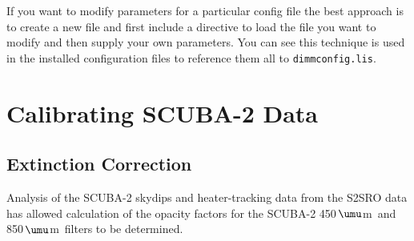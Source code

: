 \documentclass[twoside,11pt]{article}
\newcommand{\micron}{\mbox{\,${\umu}$m}}            %
\newcommand{\xlabel}[1]{}
\renewcommand{\_}{\texttt{\symbol{95}}}
\begin{document}
\begin{description}


\end{description}

If you want to modify parameters for a particular config file the best
approach is to create a new file and first include a directive to load
the file you want to modify and then supply your own parameters. You
can see this technique is used in the installed configuration files to
reference them all to \texttt{dimmconfig.lis}.

\section{\xlabel{calib}Calibrating SCUBA-2 Data}
\label{sec:calib}

\subsection{Extinction Correction}

Analysis of the SCUBA-2 skydips and heater-tracking data from the
S2SRO data has allowed calculation of the opacity factors for the
SCUBA-2 450\micron\ and 850\micron\ filters to be determined.
\end{document}
